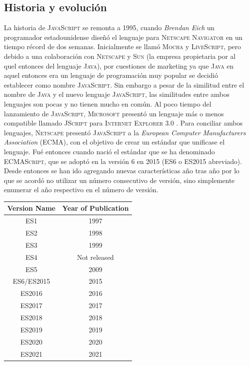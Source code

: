 \documentclass[a4paper, 11pt]{book}
\begin{document}
\subsection{Historia y evolución}
La historia de \textsc{JavaScript} se remonta a 1995, cuando \emph{Brendan Eich} un programador estadounidense diseñó el lenguaje para \textsc{Netscape Navigator} en un tiempo récord de dos semanas. Inicialmente se llamó \textsc{Mocha} y \textsc{LiveScript}, pero debido  a una colaboración con \textsc{Netscape} y \textsc{Sun} (la empresa propietaria por al quel entonces del lenguaje \textsc{Java}), por cuestiones de marketing ya que \textsc{Java} en aquel entonces era un lenguaje de programación muy popular se decidió establecer como nombre \textsc{JavaScript}.
Sin embargo a pesar de la similitud entre el nombre de \textsc{Java} y el nuevo lenguaje \textsc{JavaScript}, las similitudes entre ambos lenguajes son pocas y no tienen mucho en común.
Al poco tiempo del lanzamiento de \textsc{JavaScript}, \textsc{Microsoft} presentó un lenguaje más o menos compatible llamado \textsc{JScript} para \textsc{Internet Explorer 3.0} .
Para conciliar ambos lenguajes, \textsc{Netscape} presentó \textsc{JavaScript} a la \emph{European Computer Manufacturers Association} (\textsc{\gls{ECMA}}), con el objetivo de crear un estándar que unificase el lenguaje. Fué entonces cuando nació el estándar que se ha denominado \textsc{ECMAScript}, que se adoptó en la versión 6 en 2015 (\textsc{ES6} o \textsc{ES2015} abreviado). Desde entonces se han ido agregando nuevas características año tras año por lo que se acordó no utilizar un número consecutivo de versión, sino simplemente enumerar el año respectivo en el número de versión.
\begin{center}
	\begin{tabular}{|c|c|}
		\hline
		\textbf{Version Name} & \textbf{Year of Publication} \\
		\hline
		ES1 & 1997 \\
		ES2 & 1998 \\
		ES3 & 1999 \\
		ES4 & Not released \\
		ES5 & 2009 \\
		ES6/ES2015 & 2015 \\
		ES2016 & 2016 \\
		ES2017 & 2017 \\
		ES2018 & 2018 \\
		ES2019 & 2019 \\
		ES2020 & 2020 \\
		ES2021 & 2021 \\
		\hline
	\end{tabular}
\end{center}
\end{document}
